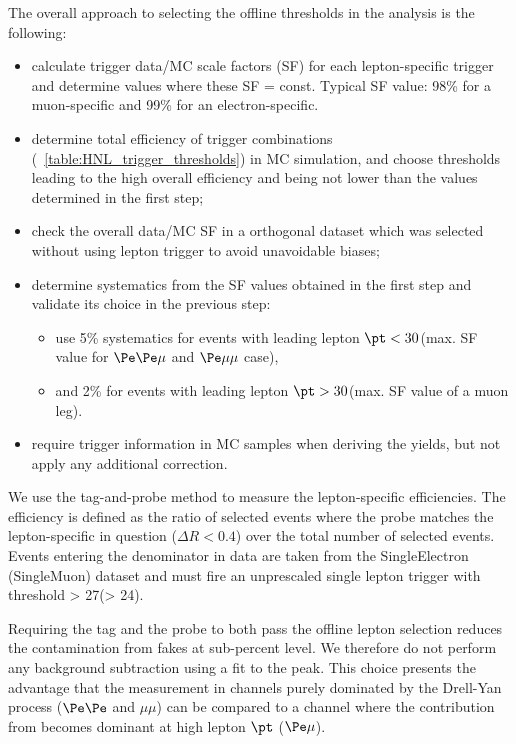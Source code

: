 The overall approach to selecting the offline thresholds in the analysis is the following:

\begin{itemize}
\item calculate trigger data/MC scale factors (SF) for each lepton-specific trigger and determine values where these SF = const. Typical SF value: 98\% for a muon-specific and 99\% for an electron-specific. 
\item determine total efficiency of trigger combinations (~\ref{table:HNL_trigger_thresholds}) in MC simulation, and choose \pt thresholds leading to the high overall efficiency and being not lower than the values determined in the first step;
\item check the overall data/MC SF in a orthogonal dataset which was
  selected without using lepton trigger to avoid unavoidable biases;
\item determine systematics from the SF values obtained in the first step and validate its choice in the previous step: 
\begin{itemize}
\item use 5\% systematics for events with leading lepton $\pt < 30$\GeV (max. SF value for $\Pe\Pe\mu$ and $\Pe\mu\mu$ case),
\item and 2\% for events with leading lepton $\pt > 30$\GeV (max. SF value of a muon leg).
\end{itemize}
\item require trigger information in MC samples when deriving the yields, but not apply any additional correction.
\end{itemize}

We use the tag-and-probe method to measure the lepton-specific efficiencies. The efficiency is 
defined as the ratio of selected events where the probe matches the lepton-specific in question ($\Delta R<0.4$) over 
the total number of selected events. Events entering the denominator in data are taken from the 
SingleElectron (SingleMuon) dataset and must fire an unprescaled
single lepton trigger with \pt threshold > 27\GeV (> 24\GeV).

Requiring the tag and the probe to both pass the offline lepton selection reduces the contamination 
from fakes at sub-percent level. We therefore do not perform any background subtraction using a fit to 
the \PZ peak. This choice presents the advantage that the measurement in channels purely dominated by the 
Drell-Yan process ($\Pe\Pe$ and $\mu\mu$) can be compared to a channel where the contribution from \ttbar 
becomes dominant at high lepton $\pt$ ($\Pe\mu$).

